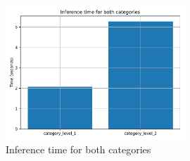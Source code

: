 \begin{figure}[htpb]
	\centering
	\includegraphics[width=0.6\textwidth]{Images/eval_inference_time.pdf}
	\caption{Inference time for both categories}
	\label{fig:inference_time}
\end{figure} 